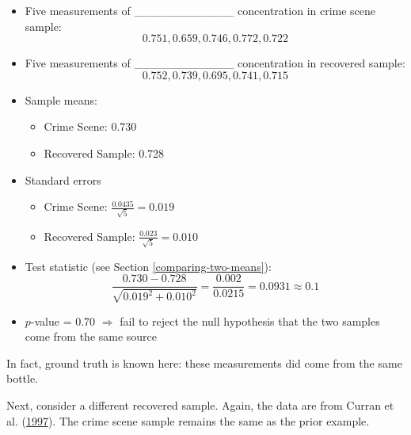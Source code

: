 \documentclass[]{book}
\providecommand{\tightlist}{%
  \setlength{\itemsep}{0pt}\setlength{\parskip}{0pt}}
\theoremstyle{definition}
\theoremstyle{definition}
\theoremstyle{remark}
\begin{document}
\begin{itemize}
\item
  Five measurements of \_\_\_\_\_\_\_\_\_\_\_\_ concentration in crime
  scene sample: \[0.751, 0.659, 0.746, 0.772, 0.722\]
\item
  Five measurements of \_\_\_\_\_\_\_\_\_\_\_\_ concentration in
  recovered sample: \[0.752, 0.739, 0.695, 0.741, 0.715\]
\item
  Sample means:

  \begin{itemize}
  \tightlist
  \item
    Crime Scene: 0.730
  \item
    Recovered Sample: 0.728
  \end{itemize}
\item
  Standard errors

  \begin{itemize}
  \tightlist
  \item
    Crime Scene: \(\frac{0.0435}{\sqrt{5}}=0.019\)
  \item
    Recovered Sample: \(\frac{0.023}{\sqrt{5}}=0.010\)
  \end{itemize}
\item
  Test statistic (see Section \ref{comparing-two-means}):
  \[\frac{0.730 - 0.728}{\sqrt{0.019^2 + 0.010^2}} = \frac{0.002}{0.0215} = 0.0931 \approx 0.1\]
\item
  \(p\)-value = 0.70 \(\Rightarrow\) fail to reject the null hypothesis
  that the two samples come from the same source
\end{itemize}

In fact, ground truth is known here: these measurements did come from
the same bottle.

Next, consider a different recovered sample. Again, the data are from
Curran et al. (\protect\hyperlink{ref-curranetal}{1997}). The crime
scene sample remains the same as the prior example.
\end{document}

